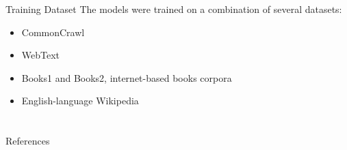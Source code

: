 \documentclass{beamer}
\begin{document}
\begin{frame}{Training Dataset}
    The models were trained on a combination of several datasets:
    \begin{itemize}
        \item CommonCrawl
        \item WebText
        \item Books1 and Books2, internet-based books corpora
        \item English-language Wikipedia
    \end{itemize}
\end{frame}

\section{}

\begin{frame}{References}
    \nocite{*}
    \printbibliography
\end{frame}
\end{document}
